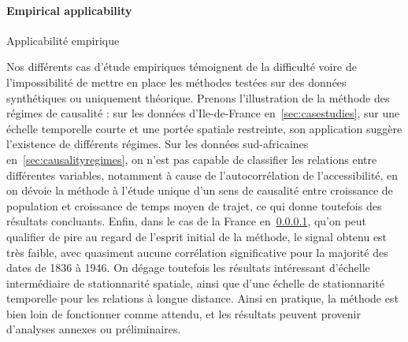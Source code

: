 





\paragraph{Empirical applicability}{Applicabilité empirique}

Nos différents cas d'étude empiriques témoignent de la difficulté voire de l'impossibilité de mettre en place les méthodes testées sur des données synthétiques ou uniquement théorique. Prenons l'illustration de la méthode des régimes de causalité : sur les données d'Ile-de-France en~\ref{sec:casestudies}, sur une échelle temporelle courte et une portée spatiale restreinte, son application suggère l'existence de différents régimes. Sur les données sud-africaines en~\ref{sec:causalityregimes}, on n'est pas capable de classifier les relations entre différentes variables, notamment à cause de l'autocorrélation de l'accessibilité, en on dévoie la méthode à l'étude unique d'un sens de causalité entre croissance de population et croissance de temps moyen de trajet, ce qui donne toutefois des résultats concluants. Enfin, dans le cas de la France en~\ref{}, qu'on peut qualifier de pire au regard de l'esprit initial de la méthode, le signal obtenu est très faible, avec quasiment aucune corrélation significative pour la majorité des dates de 1836 à 1946. On dégage toutefois les résultats intéressant d'échelle intermédiaire de stationnarité spatiale, ainsi que d'une échelle de stationnarité temporelle pour les relations à longue distance. Ainsi en pratique, la méthode est bien loin de fonctionner comme attendu, et les résultats peuvent provenir d'analyses annexes ou préliminaires.


